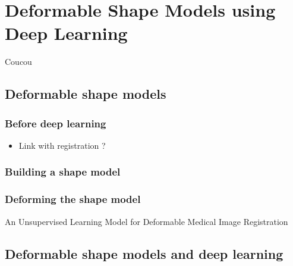 \chapter{Deformable Shape Models using Deep Learning}
\label{chap:seg}

\begin{chapabstract}
 Coucou
\end{chapabstract}

\vspace{1cm}

{   
    \minitoc
}

\newpage

\section{Deformable shape models}

\subsection{Before deep learning}

\begin{itemize}
    \item Link with registration ?
\end{itemize}

\subsection{Building a shape model}

\subsection{Deforming the shape model}

An Unsupervised Learning Model for Deformable Medical Image Registration



\section{Deformable shape models and deep learning}


